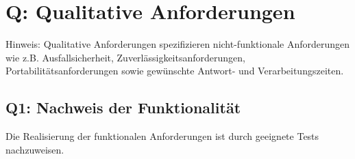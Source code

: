\documentclass[10pt,a4paper]{scrartcl}
\begin{document}




\section{Q: Qualitative Anforderungen}
Hinweis: Qualitative Anforderungen spezifizieren nicht-funktionale Anforderungen wie z.B. Ausfallsicherheit, Zuverlässigkeitsanforderungen, Portabilitätsanforderungen sowie gewünschte Antwort- und Verarbeitungszeiten.

\subsection{Q1: Nachweis der Funktionalität}
Die Realisierung der funktionalen Anforderungen ist durch geeignete Tests nachzuweisen.
\end{document}
